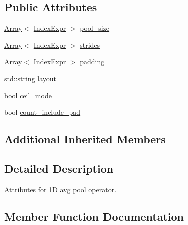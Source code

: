\subsection*{Public Attributes}
\begin{DoxyCompactItemize}
\item 
\hyperlink{classtvm_1_1Array}{Array}$<$ \hyperlink{namespacetvm_1_1relay_ae153a27d81399fd266b8d598227764c4}{Index\+Expr} $>$ \hyperlink{structtvm_1_1relay_1_1AvgPool1DAttrs_a21d129b7f51e96d3f60277765f5def04}{pool\+\_\+size}
\item 
\hyperlink{classtvm_1_1Array}{Array}$<$ \hyperlink{namespacetvm_1_1relay_ae153a27d81399fd266b8d598227764c4}{Index\+Expr} $>$ \hyperlink{structtvm_1_1relay_1_1AvgPool1DAttrs_a07cc53b61ea1287df0fc6265b2e50c99}{strides}
\item 
\hyperlink{classtvm_1_1Array}{Array}$<$ \hyperlink{namespacetvm_1_1relay_ae153a27d81399fd266b8d598227764c4}{Index\+Expr} $>$ \hyperlink{structtvm_1_1relay_1_1AvgPool1DAttrs_a8b1a5a871c291f50af252b0ef4e30e1f}{padding}
\item 
std\+::string \hyperlink{structtvm_1_1relay_1_1AvgPool1DAttrs_ae841ee394e1455dcb61656303f0358f0}{layout}
\item 
bool \hyperlink{structtvm_1_1relay_1_1AvgPool1DAttrs_ac9c3f2c26da975c9d78bc33955163281}{ceil\+\_\+mode}
\item 
bool \hyperlink{structtvm_1_1relay_1_1AvgPool1DAttrs_a40706eb3415bd5cec546d10721c41c8a}{count\+\_\+include\+\_\+pad}
\end{DoxyCompactItemize}
\subsection*{Additional Inherited Members}


\subsection{Detailed Description}
Attributes for 1D avg pool operator. 

\subsection{Member Function Documentation}
